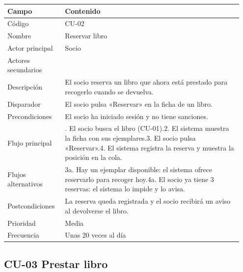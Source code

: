 \documentclass[11pt,a4paper]{article}
\begin{document}
{\small
\begin{longtable}{@{}>{\raggedright\arraybackslash}p{0.232\linewidth}>{\raggedright\arraybackslash}p{0.717\linewidth}@{}}
\toprule
\textbf{Campo} & \textbf{Contenido} \\
\midrule
\endhead
Código & CU-02 \\
Nombre & Reservar libro \\
Actor principal & Socio \\
Actores secundarios &  \\
Descripción & El socio reserva un libro que ahora está prestado para recogerlo cuando se devuelva. \\
Disparador & El socio pulsa «Reservar» en la ficha de un libro. \\
Precondiciones & El socio ha iniciado sesión y no tiene sanciones. \\
Flujo principal & 1. El socio busca el libro (CU-01).\newline{}2. El sistema muestra la ficha con sus ejemplares.\newline{}3. El socio pulsa «Reservar».\newline{}4. El sistema registra la reserva y muestra la posición en la cola. \\
Flujos alternativos & 3a. Hay un ejemplar disponible: el sistema ofrece reservarlo para recoger hoy.\newline{}4a. El socio ya tiene 3 reservas: el sistema lo impide y lo avisa. \\
Postcondiciones & La reserva queda registrada y el socio recibirá un aviso al devolverse el libro. \\
Prioridad & Media \\
Frecuencia & Unas 20 veces al día \\
\bottomrule
\end{longtable}}

\subsection*{CU-03 Prestar libro}
\end{document}
